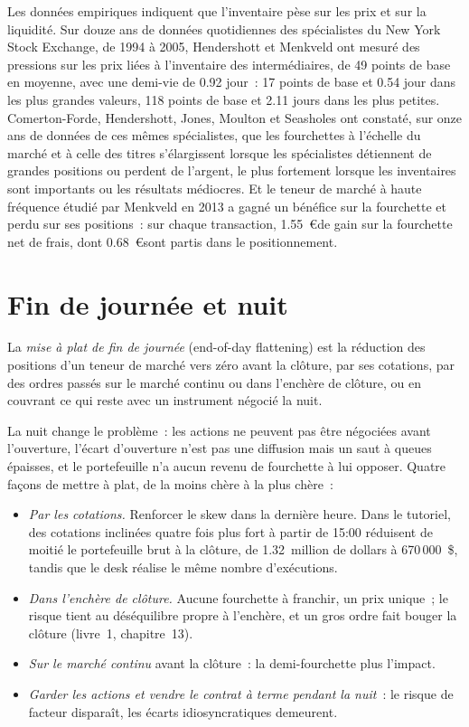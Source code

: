 Les données empiriques indiquent que l'inventaire pèse sur les prix et sur la liquidité. Sur douze ans de données quotidiennes des spécialistes du New York Stock Exchange, de 1994 à
2005, Hendershott et Menkveld ont mesuré des pressions sur les prix liées à l'inventaire des intermédiaires, de 49 points de base en moyenne, avec une demi-vie de 0.92
jour~: 17 points de base et 0.54 jour dans les plus grandes valeurs, 118 points de base et 2.11 jours dans les plus petites. Comerton-Forde, Hendershott, Jones,
Moulton et Seasholes ont constaté, sur onze ans de données de ces mêmes spécialistes, que les fourchettes à l'échelle du marché et à celle des titres s'élargissent lorsque les spécialistes détiennent
de grandes positions ou perdent de l'argent, le plus fortement lorsque les inventaires sont importants ou les résultats médiocres. Et le teneur de marché à haute fréquence étudié par Menkveld en 2013 a
gagné un bénéfice sur la fourchette et perdu sur ses positions~: sur chaque transaction, 1.55~\euro de gain sur la fourchette net de frais, dont 0.68~\euro sont partis dans le positionnement.

\section{Fin de journée et nuit}

\begin{definition}\label{def:hf:hedging-and-inventory-in-practice:flatten}
La \emph{mise à plat de fin de journée} (end-of-day flattening) est la réduction des positions d'un teneur de marché vers zéro avant la clôture, par ses
cotations, par des ordres passés sur le marché continu ou dans l'enchère de clôture, ou en couvrant ce qui reste avec un instrument négocié la nuit.
\end{definition}

La nuit change le problème~: les actions ne peuvent pas être négociées avant l'ouverture, l'écart d'ouverture n'est pas une diffusion mais un saut à queues épaisses, et
le portefeuille n'a aucun revenu de fourchette à lui opposer. Quatre façons de mettre à plat, de la moins chère à la plus chère~:

\begin{itemize}
\item \emph{Par les cotations.} Renforcer le skew dans la dernière heure. Dans le tutoriel, des cotations inclinées quatre fois plus fort à partir de 15:00 réduisent de moitié le portefeuille brut à
la clôture, de 1.32~million de dollars à 670\,000~\$, tandis que le desk réalise le même nombre d'exécutions.
\item \emph{Dans l'enchère de clôture.} Aucune fourchette à franchir, un prix unique~; le risque tient au déséquilibre propre à l'enchère, et un gros ordre fait bouger la clôture
(livre~1, chapitre~13).
\item \emph{Sur le marché continu} avant la clôture~: la demi-fourchette plus l'impact.
\item \emph{Garder les actions et vendre le contrat à terme pendant la nuit}~: le risque de facteur disparaît, les écarts idiosyncratiques demeurent.
\end{itemize}

